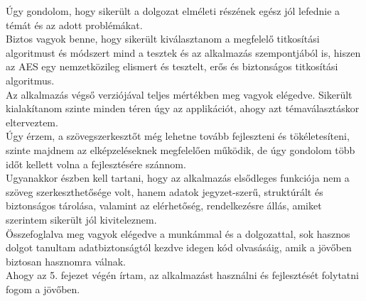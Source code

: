 
Úgy gondolom, hogy sikerült a dolgozat elméleti részének egész jól lefednie a témát és az adott problémákat.
\vspace{5pt} \\  Biztos vagyok benne, hogy sikerült kiválasztanom a megfelelő titkosítási algoritmust és módszert mind a tesztek és az alkalmazás szempontjából is, hiszen az AES egy nemzetközileg elismert és tesztelt, erős és biztonságos titkosítási algoritmus.
\vspace{5pt}\\ Az alkalmazás végső verziójával teljes mértékben meg vagyok elégedve. Sikerült kialakítanom szinte minden téren úgy az applikációt, ahogy azt témaválasztáskor elterveztem.
\vspace{5pt} \\ Úgy érzem, a szövegszerkesztőt még lehetne  tovább fejleszteni és tökéletesíteni, szinte majdnem az elképzeléseknek megfelelően működik, de úgy gondolom több időt kellett volna a fejlesztésére szánnom. \\Ugyanakkor észben kell tartani, hogy az alkalmazás elsődleges funkciója nem a szöveg szerkeszthetősége volt, hanem adatok jegyzet-szerű, struktúrált és biztonságos tárolása, valamint az elérhetőség, rendelkezésre állás, amiket szerintem sikerült jól kiviteleznem.
\vspace{5pt}\\ Összefoglalva meg vagyok elégedve a munkámmal és a dolgozattal, sok hasznos dolgot tanultam adatbiztonságtól kezdve idegen kód olvasásáig, amik a jövőben biztosan hasznomra válnak.
\vspace{5pt}\\ Ahogy az 5. fejezet végén írtam, az alkalmazást használni és fejlesztését folytatni fogom a jövőben.



